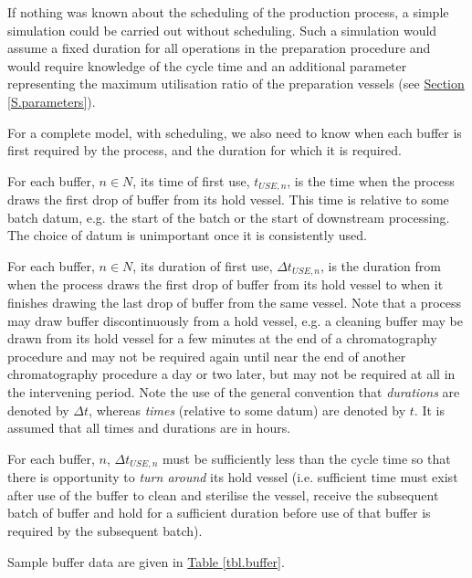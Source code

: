 If nothing was known about the scheduling of the production process, a simple
simulation could be carried out without scheduling.
Such a simulation would assume a fixed duration for all operations in the
preparation procedure and would require knowledge of the cycle time and an
additional parameter representing the maximum utilisation ratio of the
preparation vessels (see \hyperref[S.parameters]{Section \ref*{S.parameters}}).

For a complete model, with scheduling, we also need to know when each buffer
is first required by the process, and the duration for which it is required.

For each buffer, $n \in N$, its time of first use, $t_{\mathit{USE},n}$, is the
time when the process draws the first drop of buffer from its hold vessel.
This time is relative to some batch datum, e.g. the start of the batch or the
start of downstream processing.
The choice of datum is unimportant once it is consistently used.

For each buffer, $n \in N$, its duration of first use,
$\Delta t_{\mathit{USE},n}$, is the duration from when the process draws the
first drop of buffer from its hold vessel to when it finishes drawing the last
drop of buffer from the same vessel.
Note that a process may draw buffer discontinuously from a hold vessel, e.g. a
cleaning buffer may be drawn from its hold vessel for a few minutes at the end
of a chromatography procedure and may not be required again until near the end
of another chromatography procedure a day or two later, but may not be required
at all in the intervening period.
Note the use of the general convention that \emph{durations} are denoted by
$\Delta t$, whereas \emph{times} (relative to some datum) are denoted by $t$.
It is assumed that all times and durations are in hours.

For each buffer, $n$, $\Delta t_{\mathit{USE},n}$ must be sufficiently less
than the cycle time so that there is opportunity to \emph{turn around} its hold
vessel (i.e. sufficient time must exist after use of the buffer to clean and
sterilise the vessel, receive the subsequent batch of buffer and hold for a
sufficient duration before use of that buffer is required by the subsequent
batch).

Sample buffer data are given in \hyperref[tbl.buffer]{Table \ref*{tbl.buffer}}.

